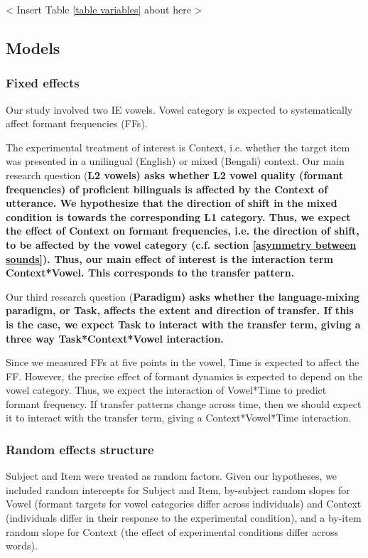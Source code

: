 \documentclass[12 pt]{article}
\begin{document}
< Insert Table \ref{table variables} about here > \\

\subsection{Models}

\subsubsection*{Fixed effects}

Our study involved two IE vowels. Vowel category is expected to systematically affect formant frequencies (FFs). 

The experimental treatment of interest is Context, i.e. whether the target item was presented in a unilingual (English) or mixed (Bengali) context. Our main research question (\bf{L2 vowels}) asks whether L2 vowel quality (formant frequencies) of proficient bilinguals is affected by the Context of utterance. We hypothesize that the direction of shift in the mixed condition is towards the corresponding L1 category. Thus, we expect the effect of Context on formant frequencies, i.e. the direction of shift, to be affected by the vowel category (c.f. section \ref{asymmetry between sounds}). Thus, our main effect of interest is the interaction term Context*Vowel. This corresponds to the transfer pattern.

Our third research question (\bf{Paradigm}) asks whether the language-mixing paradigm, or Task, affects the extent and direction of transfer. If this is the case, we expect Task to interact with the transfer term, giving a three way Task*Context*Vowel interaction.

Since we measured FFs at five points in the vowel, Time is expected to affect the FF. However, the precise effect of formant dynamics is expected to depend on the vowel category. Thus, we expect the interaction of Vowel*Time to predict formant frequency. If transfer patterns change across time, then we should expect it to interact with the transfer term, giving a Context*Vowel*Time interaction.

\subsubsection*{Random effects structure}

Subject and Item were treated as random factors. Given our hypotheses, we included random intercepts for Subject and Item, by-subject random slopes for Vowel (formant targets for vowel categories differ across individuals) and Context (individuals differ in their response to the experimental condition), and a by-item random slope for Context (the effect of experimental conditions differ across words). 
\end{document}
